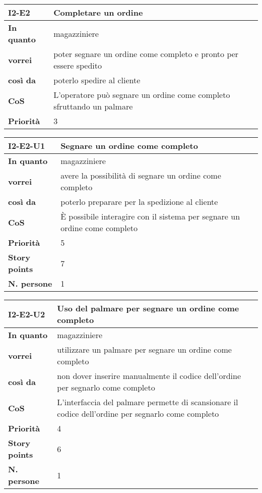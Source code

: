 \begin{table}[H]
  \begin{tabularx}{\textwidth}{lX}
    \toprule
    \textbf{I2-E2} & \textbf{Completare un ordine} \\
    \midrule
    \textbf{In quanto} & magazziniere \\
    \textbf{vorrei} & poter segnare un ordine come completo e pronto per essere spedito \\
    \textbf{così da} & poterlo spedire al cliente \\
    \midrule
    \textbf{CoS} & L'operatore può segnare un ordine come completo sfruttando un palmare \\
    \midrule
    \textbf{Priorità} & 3 \\
    \bottomrule
  \end{tabularx}
  \label{user-story:i2-e2}
\end{table}

\begin{table}[H]
  \begin{tabularx}{\textwidth}{lX}
    \toprule
    \textbf{I2-E2-U1} & \textbf{Segnare un ordine come completo} \\
    \midrule
    \textbf{In quanto} & magazziniere \\
    \textbf{vorrei} & avere la possibilità di segnare un ordine come completo \\
    \textbf{così da} & poterlo preparare per la spedizione al cliente \\
    \midrule
    \textbf{CoS} & È possibile interagire con il sistema per segnare un ordine come completo \\
    \midrule
    \textbf{Priorità} & 5 \\
    \textbf{Story points} & 7 \\
    \textbf{N. persone} & 1 \\
    \bottomrule
  \end{tabularx}
  \label{user-story:i2-e2-u1}
\end{table}

\begin{table}[H]
  \begin{tabularx}{\textwidth}{lX}
    \toprule
    \textbf{I2-E2-U2} & \textbf{Uso del palmare per segnare un ordine come completo} \\
    \midrule
    \textbf{In quanto} & magazziniere \\
    \textbf{vorrei} & utilizzare un palmare per segnare un ordine come completo \\
    \textbf{così da} & non dover inserire manualmente il codice dell'ordine per segnarlo come completo\\
    \midrule
    \textbf{CoS} & L'interfaccia del palmare permette di scansionare il codice dell'ordine per segnarlo come completo \\
    \midrule
    \textbf{Priorità} & 4 \\
    \textbf{Story points} & 6 \\
    \textbf{N. persone} & 1 \\
    \bottomrule
  \end{tabularx}
  \label{user-story:i2-e2-u2}
\end{table}

